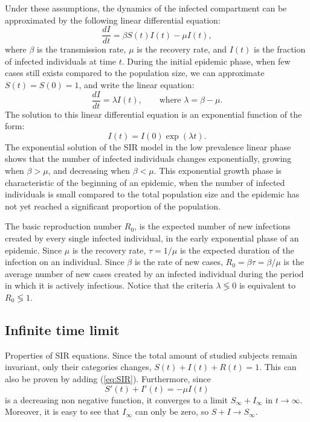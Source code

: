Under these assumptions, the dynamics of the infected compartment can be approximated by the following linear differential equation:
\begin{equation}
    \frac{dI}{dt} = \beta S(t) I(t) - \mu I(t),
\end{equation}
where $\beta$ is the transmission rate, $\mu$ is the recovery rate, and $I(t)$ is the fraction of infected individuals at time $t$. During the initial epidemic phase, when few cases still exists compared to the population size, we can approximate $S(t) = S(0) = 1$, and write the linear equation:
\begin{equation}
    \frac{dI}{dt} = \lambda I(t), \qquad \mbox{where }   \lambda = \beta - \mu.
\end{equation}
The solution to this linear differential equation is an exponential function of the form:
\begin{equation}
    I(t) = I(0) \exp(\lambda t).
\end{equation}
The exponential solution of the SIR model in the low prevalence linear phase shows that the number of infected individuals changes exponentially, growing when $\beta>\mu$, and decreasing when $\beta<\mu$.  This exponential growth phase is characteristic of the beginning of an epidemic, when the number of infected individuals is small compared to the total population size and the epidemic has not yet reached a significant proportion of the population. 

The basic reproduction number $R_0$, is the expected number of new infections created by every single infected individual, in the early exponential phase of an epidemic. Since $\mu$ is the recovery rate, $\tau = 1/\mu$ is the expected duration of the infection on an individual. Since $\beta$ is the rate of new cases, $R_0 = \beta \tau = \beta/\mu$ is the average number of new cases created by an infected individual during the period in which it is actively infectious. Notice that the criteria $\lambda \lessgtr 0$ is equivalent to $R_0 \lessgtr 1$.


\subsection{Infinite time limit}

Properties of SIR equations. Since the total amount of studied subjects remain invariant, only their categories changes, $S(t)+I(t)+R(t) =1$. This can also be proven by adding (\ref{eq:SIR}). Furthermore, since \[ S'(t)+I'(t) = -\mu I(t)\] is a decreasing non negative function, it converges to a limit $S_\infty + I_\infty$ in $t\to\infty$. Moreover, it is easy to see that $I_\infty$ can only be zero, so $S+I \to S_\infty$.

